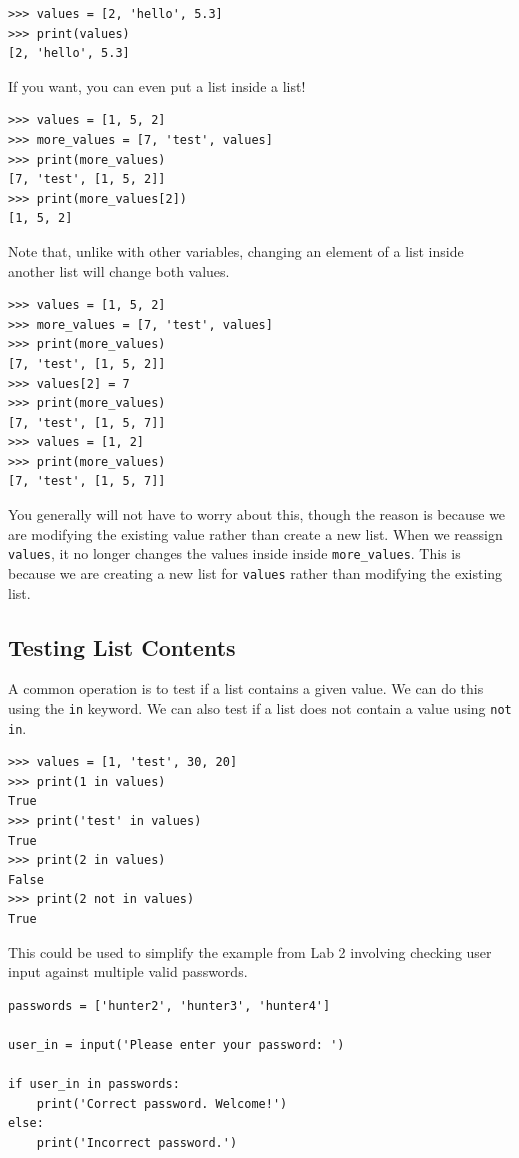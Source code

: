 \documentclass[11pt]{cselabheader}
\begin{document}
\begin{lstlisting}[style=ipython]
>>> values = [2, 'hello', 5.3]
>>> print(values)
[2, 'hello', 5.3]
\end{lstlisting}

If you want, you can even put a list inside a list!

\begin{lstlisting}[style=ipython]
>>> values = [1, 5, 2]
>>> more_values = [7, 'test', values]
>>> print(more_values)
[7, 'test', [1, 5, 2]]
>>> print(more_values[2])
[1, 5, 2]
\end{lstlisting}

Note that, unlike with other variables, changing an element of a list inside
another list will change both values.

\begin{lstlisting}[style=ipython]
>>> values = [1, 5, 2]
>>> more_values = [7, 'test', values]
>>> print(more_values)
[7, 'test', [1, 5, 2]]
>>> values[2] = 7
>>> print(more_values)
[7, 'test', [1, 5, 7]]
>>> values = [1, 2]
>>> print(more_values)
[7, 'test', [1, 5, 7]]
\end{lstlisting}

You generally will not have to worry about this, though the reason is because we
are modifying the existing value rather than create a new list. When we reassign
\lstinline{values}, it no longer changes the values inside inside
\lstinline{more_values}. This is because we are creating a new list for
\lstinline{values} rather than modifying the existing list.

\subsection{Testing List Contents}
A common operation is to test if a list contains a given value. We can do this
using the \lstinline{in} keyword. We can also test if a list does not contain a
value using \lstinline{not in}.

\begin{lstlisting}[style=ipython]
>>> values = [1, 'test', 30, 20]
>>> print(1 in values)
True
>>> print('test' in values)
True
>>> print(2 in values)
False
>>> print(2 not in values)
True
\end{lstlisting}

This could be used to simplify the example from Lab 2 involving checking user
input against multiple valid passwords.

\begin{lstlisting}[style=python]
passwords = ['hunter2', 'hunter3', 'hunter4']

user_in = input('Please enter your password: ')

if user_in in passwords:
    print('Correct password. Welcome!')
else:
    print('Incorrect password.')
\end{lstlisting}
\end{document}
